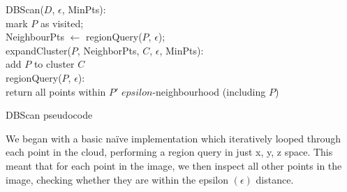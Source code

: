\documentclass[]{article}
\begin{document}
{\begin{figure}[bt]
\end{figure}

\begin{algorithm}[tb]
	\SetAlgoLined
	\bigskip
	DBScan($D$, $\epsilon$, MinPts): \\
	{
		mark $P$ as visited; \\
		NeighbourPts $\leftarrow$ regionQuery($P$, $\epsilon$); \\
	}
	\bigskip
	expandCluster($P$, NeighborPts, $C$, $\epsilon$, MinPts):  \\
	add $P$ to cluster $C$ \\
	\bigskip
	regionQuery($P$, $\epsilon$):  \\
	{
 		return all points within $P'$ $epsilon$-neighbourhood (including $P$)
	}
	\bigskip
	\caption{\ac{DBScan} pseudocode}
	\label{alg:dbscan}
\end{algorithm}

We began with a basic naïve implementation which iteratively looped through each point in the cloud, performing a region query in just x, y, z space. This meant that for each point in the image, we then inspect all other points in the image, checking whether they are within the epsilon $(\epsilon)$ distance. 

}
\end{document}
